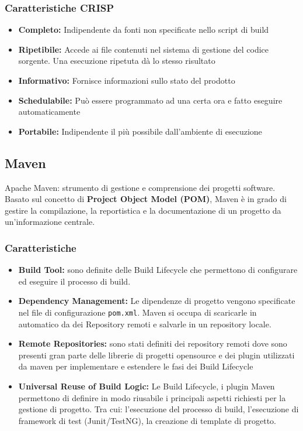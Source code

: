 \subsubsection{Caratteristiche CRISP}
\begin{itemize}
    \item \textbf{Completo:} Indipendente da fonti non specificate nello script di build
    \item \textbf{Ripetibile:} Accede ai file contenuti nel sistema di gestione del codice sorgente. Una esecuzione ripetuta dà lo stesso risultato
    \item \textbf{Informativo:} Fornisce informazioni sullo stato del prodotto
    \item \textbf{Schedulabile:} Può essere programmato ad una certa ora e fatto eseguire automaticamente
    \item \textbf{Portabile:} Indipendente il più possibile dall’ambiente di esecuzione
\end{itemize}

\newpage
\subsection{Maven}
\begin{mdframed}
    Apache Maven: strumento di gestione e comprensione dei progetti software. Basato sul concetto di \textbf{Project Object Model (POM)}, Maven è in grado di gestire la compilazione, la reportistica e la documentazione di un progetto da un'informazione centrale.
\end{mdframed}

\subsubsection{Caratteristiche}
\begin{itemize}
    \item \textbf{Build Tool:} sono definite delle Build Lifecycle che permettono di configurare ed eseguire il processo di build.
    \item \textbf{Dependency Management:} Le dipendenze di progetto vengono specificate nel file di configurazione \verb|pom.xml|. Maven si occupa di scaricarle in automatico da dei Repository remoti e salvarle in un repository locale.
    \item \textbf{Remote Repositories:} sono stati definiti dei repository remoti dove sono presenti gran parte delle librerie di progetti opensource e dei plugin utilizzati da maven per implementare e estendere le fasi dei Build Lifecycle
    \item \textbf{Universal Reuse of Build Logic:} Le Build Lifecycle, i plugin Maven permettono di definire in modo riusabile i principali aspetti richiesti per la gestione di progetto. Tra cui: l'esecuzione del processo di build, l'esecuzione di framework di test (Junit/TestNG), la creazione di template di progetto.
\end{itemize}


